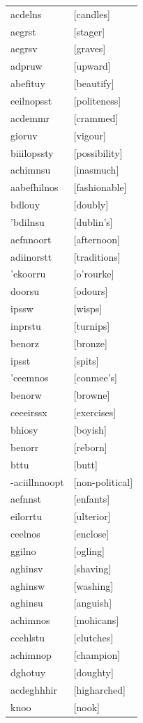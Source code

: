 \documentclass{article}
\begin{document}
\begin{tabular}{ll}
acdelns & [candles] \\
aegrst & [stager] \\
aegrsv & [graves] \\
adpruw & [upward] \\
abefituy & [beautify] \\
eeilnopsst & [politeness] \\
acdemmr & [crammed] \\
gioruv & [vigour] \\
biiilopssty & [possibility] \\
achimnsu & [inasmuch] \\
aabefhilnos & [fashionable] \\
bdlouy & [doubly] \\
'bdilnsu & [dublin's] \\
aefnnoort & [afternoon] \\
adiinorstt & [traditions] \\
'ekoorru & [o'rourke] \\
doorsu & [odours] \\
ipssw & [wisps] \\
inprstu & [turnips] \\
benorz & [bronze] \\
ipsst & [spits] \\
'ceemnos & [conmee's] \\
benorw & [browne] \\
ceeeirssx & [exercises] \\
bhiosy & [boyish] \\
benorr & [reborn] \\
bttu & [butt] \\
-aciillnnoopt & [non-political] \\
aefnnst & [enfants] \\
eilorrtu & [ulterior] \\
ceelnos & [enclose] \\
ggilno & [ogling] \\
aghinsv & [shaving] \\
aghinsw & [washing] \\
aghinsu & [anguish] \\
achimnos & [mohicans] \\
ccehlstu & [clutches] \\
achimnop & [champion] \\
dghotuy & [doughty] \\
acdeghhhir & [higharched] \\
knoo & [nook] \\

\end{tabular}
\end{document}
